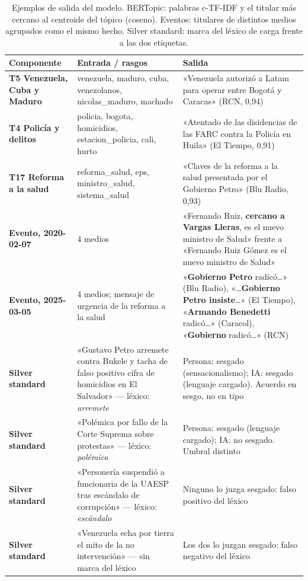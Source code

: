 \documentclass[10pt,twocolumn]{article}
\begin{document}
\begin{table}[t]
\centering\footnotesize
\caption{Ejemplos de salida del modelo. BERTopic: palabras c-TF-IDF y el titular
más cercano al centroide del tópico (coseno). Eventos: titulares de distintos
medios agrupados como el mismo hecho. Silver standard: marca del léxico de carga
frente a las dos etiquetas.}
\label{tab:ejemplos}
\begin{tabularx}{\textwidth}{>{\bfseries}p{2.6cm} p{4.6cm} Y}
\toprule
\textnormal{\textbf{Componente}} & \textbf{Entrada / rasgos} & \textbf{Salida}\\
\midrule
T5 Venezuela, Cuba y Maduro & venezuela, maduro, cuba, venezolanos, nicolas\_maduro, machado & «Venezuela autorizó a Latam para operar entre Bogotá y Caracas» (RCN, 0,94)\\
T4 Policía y delitos & policia, bogota, homicidios, estacion\_policia, cali, hurto & «Atentado de las disidencias de las FARC contra la Policía en Huila» (El Tiempo, 0,91)\\
T17 Reforma a la salud & reforma\_salud, eps, ministro\_salud, sistema\_salud & «Claves de la reforma a la salud presentada por el Gobierno Petro» (Blu Radio, 0,93)\\
\midrule
Evento, 2020-02-07 & 4 medios & «Fernando Ruiz, \textbf{cercano a Vargas Lleras}, es el nuevo ministro de Salud» frente a «Fernando Ruiz Gómez es el nuevo ministro de Salud»\\
Evento, 2025-03-05 & 4 medios; mensaje de urgencia de la reforma a la salud & «\textbf{Gobierno Petro} radicó…» (Blu Radio), «…\textbf{Gobierno Petro insiste}…» (El Tiempo), «\textbf{Armando Benedetti} radicó…» (Caracol), «\textbf{Gobierno} radicó…» (RCN)\\
\midrule
Silver standard & «Gustavo Petro arremete contra Bukele y tacha de falso positivo cifra de homicidios en El Salvador» — léxico: \emph{arremete} & Persona: sesgado (sensacionalismo); IA: sesgado (lenguaje cargado). Acuerdo en sesgo, no en tipo\\
Silver standard & «Polémica por fallo de la Corte Suprema sobre protestas» — léxico: \emph{polémica} & Persona: sesgado (lenguaje cargado); IA: no sesgado. Umbral distinto\\
Silver standard & «Personería suspendió a funcionaria de la UAESP tras escándalo de corrupción» — léxico: \emph{escándalo} & Ninguno lo juzga sesgado: falso positivo del léxico\\
Silver standard & «Venezuela echa por tierra el mito de la no intervención» — sin marca del léxico & Los dos lo juzgan sesgado: falso negativo del léxico\\
\bottomrule
\end{tabularx}
\end{table}
\end{document}
